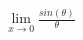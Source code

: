 \documentclass[preview]{standalone}
\begin{document}
\begin{align*}
\lim_{x\to0}\frac{sin(\theta)}{\theta}
\end{align*}
\end{document}
